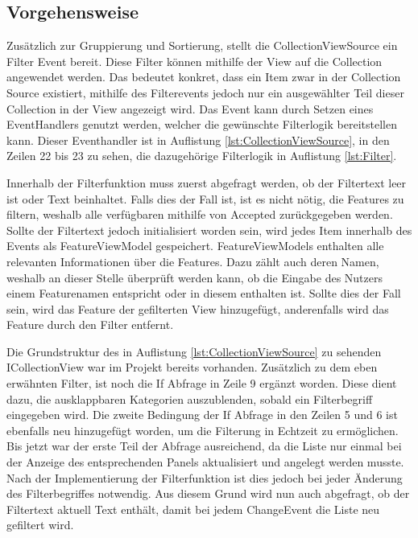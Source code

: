 \subsection {Vorgehensweise}
Zusätzlich zur Gruppierung und Sortierung, stellt die CollectionViewSource ein Filter Event bereit.
Diese Filter können mithilfe der View auf die Collection angewendet werden. 
Das bedeutet konkret, dass ein Item zwar in der Collection Source existiert, mithilfe des Filterevents jedoch nur ein ausgewählter Teil dieser Collection in der View angezeigt wird.\cite{dotnetbot.b}
Das Event kann durch Setzen eines EventHandlers genutzt werden, welcher die gewünschte Filterlogik bereitstellen kann.
Dieser Eventhandler ist in Auflistung \ref{lst:CollectionViewSource}, in den Zeilen 22 bis 23 zu sehen, die dazugehörige Filterlogik in Auflistung \ref{lst:Filter}.

\newpage


Innerhalb der Filterfunktion muss zuerst abgefragt werden, ob der Filtertext leer ist oder Text beinhaltet.
Falls dies der Fall ist, ist es nicht nötig, die Features zu filtern, weshalb alle verfügbaren mithilfe von Accepted zurückgegeben werden.
Sollte der Filtertext jedoch initialisiert worden sein, wird jedes Item innerhalb des Events als FeatureViewModel gespeichert.
FeatureViewModels enthalten alle relevanten Informationen über die Features.
Dazu zählt auch deren Namen, weshalb an dieser Stelle überprüft werden kann, ob die Eingabe des Nutzers einem Featurenamen entspricht oder in diesem enthalten ist.
Sollte dies der Fall sein, wird das Feature der gefilterten View hinzugefügt, anderenfalls wird das Feature durch den Filter entfernt.



Die Grundstruktur des in Auflistung \ref{lst:CollectionViewSource} zu sehenden ICollectionView war im Projekt bereits vorhanden. 
Zusätzlich zu dem eben erwähnten Filter, ist noch die If Abfrage in Zeile 9 ergänzt worden.
Diese dient dazu, die ausklappbaren Kategorien auszublenden, sobald ein Filterbegriff eingegeben wird.
Die zweite Bedingung der If Abfrage in den Zeilen 5 und 6 ist ebenfalls neu hinzugefügt worden, um die Filterung in Echtzeit zu ermöglichen.
Bis jetzt war der erste Teil der Abfrage ausreichend, da die Liste nur einmal bei der Anzeige des entsprechenden Panels aktualisiert und angelegt werden musste. Nach der Implementierung der Filterfunktion ist dies jedoch bei jeder Änderung des Filterbegriffes notwendig.
Aus diesem Grund wird nun auch abgefragt, ob der Filtertext aktuell Text enthält, damit bei jedem ChangeEvent die Liste neu gefiltert wird.

